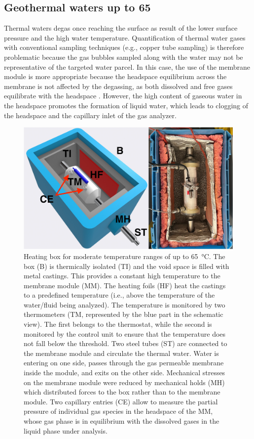 \subsection{Geothermal waters up to 65\textcelsius}\label{sec:mod-high}
Thermal waters degas once reaching the surface as result of the lower surface pressure and the high water temperature. 
Quantification of thermal water gases with conventional sampling techniques (e.g., copper tube sampling) is therefore problematic because the gas bubbles sampled along with the water may not be representative of the targeted water parcel.
In this case, the use of the membrane module is more appropriate because the headspace equilibrium across the membrane is not affected by the degassing, as both dissolved and free gases equilibrate with the headspace \citep{lightfoot2022noble}.
However, the high content of gaseous water in the headspace promotes the formation of liquid water, which leads to clogging of the headspace and the capillary inlet of the gas analyzer. 

\begin{figure}[ht!]
\begin{center}
\includegraphics[width=1\textwidth]{chapters/02_chap1/figures/figure_1.jpeg}
\end{center}
\caption{
Heating box for moderate temperature ranges of up to \SI{65}{\celsius}. 
The box (B) is thermically isolated (TI) and the void space is filled with metal castings. 
This provides a constant high temperature to the membrane module (MM).
The heating foils (HF) heat the castings to a predefined temperature (i.e., above the temperature of the water/fluid being analyzed).
The temperature is monitored by two thermometers (TM, represented by the blue part in the schematic view).
The first belongs to the thermostat, while the second is monitored by the control unit to ensure that the temperature does not fall below the threshold. 
Two steel tubes (ST) are connected to the membrane module and circulate the thermal water.
Water is entering on one side, passes through the gas permeable membrane inside the module, and exits on the other side.
Mechanical stresses on the membrane module were reduced by mechanical holds (MH) which distributed forces to the box rather than to the membrane module. 
Two capillary entries (CE) allow to measure the partial pressure of individual gas species in the headspace of the MM, whose gas phase is in equilibrium with the dissolved gases in the liquid phase under analysis. 
}
\label{fig:1}
\end{figure}

